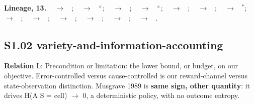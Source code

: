 \documentclass[10pt]{article}
\newcommand{\memb}[1]{\par\smallskip\textbf{#1}\quad}
\begin{document}
\memb{Lineage, 13.} {\footnotesize \citeauthor{Craik-nature43}~\citeyear{Craik-nature43} $\to$ \citeauthor{McNamee-internal19}~\citeyear{McNamee-internal19}; \citeauthor{Schrodinger-what44}~\citeyear{Schrodinger-what44} $\to$ \citeauthor{Berseth-smirl21}~\citeyear{Berseth-smirl21}$^\times$; \citeauthor{Sommerhoff-analytical50}~\citeyear{Sommerhoff-analytical50} $\to$ \citeauthor{Conant-good70}~\citeyear{Conant-good70}; \citeauthor{Ashby-design52}~\citeyear{Ashby-design52} $\to$ \citeauthor{Powers-feedback73}~\citeyear{Powers-feedback73}$^\times$; \citeauthor{Ashby-introduction56}~\citeyear{Ashby-introduction56} $\to$ \citeauthor{Conant-information69}~\citeyear{Conant-information69}; \citeauthor{Ashby-introduction56}~\citeyear{Ashby-introduction56} $\to$ \citeauthor{Conant-good70}~\citeyear{Conant-good70}; \citeauthor{Ashby-introduction56}~\citeyear{Ashby-introduction56} $\to$ \citeauthor{Powers-feedback73}~\citeyear{Powers-feedback73}$^\ast$; \citeauthor{Ashby-introduction56}~\citeyear{Ashby-introduction56} $\to$ \citeauthor{Touchette-information04}~\citeyear{Touchette-information04}; \citeauthor{Ashby-introduction56}~\citeyear{Ashby-introduction56} $\to$ \citeauthor{Boyd-leveraging16}~\citeyear{Boyd-leveraging16}; \citeauthor{Ashby-introduction56}~\citeyear{Ashby-introduction56} $\to$ \citeauthor{Siegenfeld-formal22}~\citeyear{Siegenfeld-formal22}; \citeauthor{Powers-general60}~\citeyear{Powers-general60} $\to$ \citeauthor{Powers-feedback73}~\citeyear{Powers-feedback73}; \citeauthor{Powers-feedback73}~\citeyear{Powers-feedback73} $\to$ \citeauthor{Powers-quantitative78}~\citeyear{Powers-quantitative78}; \citeauthor{Powers-behavior73}~\citeyear{Powers-behavior73} $\to$ \citeauthor{Gulrez-high21}~\citeyear{Gulrez-high21}.}

\subsection{S1.02 variety-and-information-accounting}\label{node:S1-S1-02-variety-and-information-accounting}
\textbf{Relation} \textsf{L}: Precondition or limitation: the lower bound, or budget, on our objective. Error-controlled versus cause-controlled is our reward-channel versus state-observation distinction. Musgrave 1989 is \textbf{same sign, other quantity}: it drives H(A \textbar{} S = cell) \ensuremath{\to} 0, a deterministic policy, with no outcome entropy.
\end{document}
